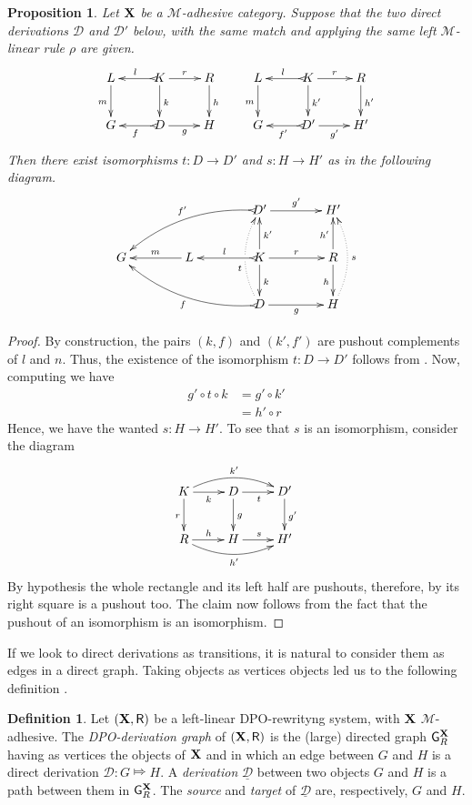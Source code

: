 \documentclass[a4paper]{article}
\def\R{\mathsf{R}}
\def\X{\textbf {\textup{X}}}
\newcommand{\dder}[1]{\mathscr{#1}}
\newcommand{\der}[1]{\underline{\dder{#1}}}
\def\gpo{\mathsf{G}^{\X}_R}
\newtheorem{proposition}[theorem]{Proposition}
\theoremstyle{definition}
\newtheorem{definition}[theorem]{Definition}
\begin{document}
\begin{proposition}\label{prop:unique} Let $\X$  be a $\mathcal{M}$-adhesive category. Suppose that the two direct derivations $\mathscr{D}$ and $\mathscr{D'}$ below, with the same match and applying the same left $\mathcal{M}$-linear rule $\rho$ are given.
	\[\xymatrix{L \ar[d]_{m}& K \ar[d]^{k}\ar@{>->}[l]_{l} \ar[r]^{r} & R \ar[d]^{h} & L \ar[d]_{m}& K \ar[d]^{k'}\ar@{>->}[l]_{l} \ar[r]^{r} & R \ar[d]^{h'}\\G & \ar@{>->}[l]^{f} D \ar[r]_{g}& H & G & \ar@{>->}[l]^{f'} D' \ar[r]_{g'}& H'}\]
Then there exist isomorphisms $t\colon D\to D'$ and $s\colon H\to H'$ as in the following diagram.
\[\xymatrix@C=40pt{&&D' \ar[r]^{g'} \ar@{>->}@/_.45cm/[dll]_{f'}&H'\\G & L \ar[l]_{m} & K \ar[u]_{k'} \ar[d]^{k}\ar[r]^{r} \ar@{>->}[l]_{l} &R\ar[u]^{h'} \ar[d]_{h}\\&&D\ar@{>->}@/^.45cm/[ull]^{f}\ar@/^.4cm/@{.>}[uu]^(.4){t}|\hole \ar[r]_{g}&H\ar@/_.4cm/@{.>}[uu]_{s}}\]
\end{proposition}
\begin{proof}
	By construction, the pairs $(k, f)$ and $(k', f')$ are pushout complements of $l$ and $n$. Thus, the existence of the isomorphism $t\colon D\to D'$ follows from . Now, computing we have
	\begin{align*}
		g'\circ t \circ k &= g' \circ k'\\&=h'\circ r
	\end{align*}
	Hence, we have the wanted $s\colon H\to H'$. To see that $s$ is an isomorphism, consider the diagram 
	\[\xymatrix{K  \ar@/^.4cm/[rr]^{k'}\ar[d]_{r} \ar[r]_{k}& \ar[r]_{t} D \ar[d]^{g}& D' \ar[d]^{g'}\\ R \ar@/_.4cm/[rr]_{h'} \ar[r]^{h}& H \ar[r]^{s}& H'}\]
	By hypothesis the whole rectangle and its left half are pushouts, therefore, by  its right square is a pushout too. The claim now follows from the fact that the pushout of an isomorphism is an isomorphism.
\end{proof}

If we look to direct derivations as transitions, it is natural to consider them as edges in a direct graph. Taking objects as vertices objects led us to the following definition \cite{heindel2009category}.

\begin{definition}
	Let $(\X, \R)$ be a left-linear DPO-rewrityng system, with $\X$ $\mathcal{M}$-adhesive. The \emph{DPO-derivation graph} of $(\X, \R)$ is the (large)  directed graph $\gpo$ having as vertices the objects of $\X$ and in which an edge between $G$ and $H$ is a direct derivation $\dder{D}\colon G\Mapsto H$.	A \emph{derivation} $\der{D}$ between two objects $G$ and $H$ is a path between them in $\gpo$. The \emph{source} and \emph{target} of $\der{D}$ are, respectively, $G$ and $H$.
\end{definition}
\end{document}
